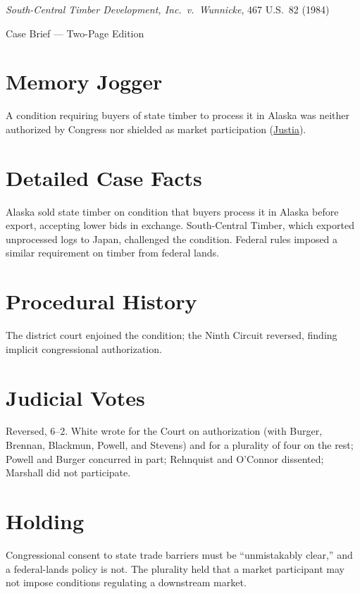 \documentclass[12pt]{article}
\begin{document}
\begin{center}
{\LARGE \textit{South-Central Timber Development, Inc.\ v.\ Wunnicke}, 467 U.S.\ 82 (1984)\par}
\vspace{0.5em}
{\large Case Brief --- Two-Page Edition\par}
\end{center}

\section{Memory Jogger}
A condition requiring buyers of state timber to process it in Alaska was neither authorized by Congress nor shielded as market participation (\href{https://supreme.justia.com/cases/federal/us/467/82/}{Justia}).

\section{Detailed Case Facts}
Alaska sold state timber on condition that buyers process it in Alaska before export, accepting lower bids in exchange. South-Central Timber, which exported unprocessed logs to Japan, challenged the condition. Federal rules imposed a similar requirement on timber from federal lands.

\section{Procedural History}
The district court enjoined the condition; the Ninth Circuit reversed, finding implicit congressional authorization.

\section{Judicial Votes}
Reversed, 6--2. White wrote for the Court on authorization (with Burger, Brennan, Blackmun, Powell, and Stevens) and for a plurality of four on the rest; Powell and Burger concurred in part; Rehnquist and O'Connor dissented; Marshall did not participate.

\section{Holding}
Congressional consent to state trade barriers must be ``unmistakably clear,'' and a federal-lands policy is not. The plurality held that a market participant may not impose conditions regulating a downstream market.
\end{document}
